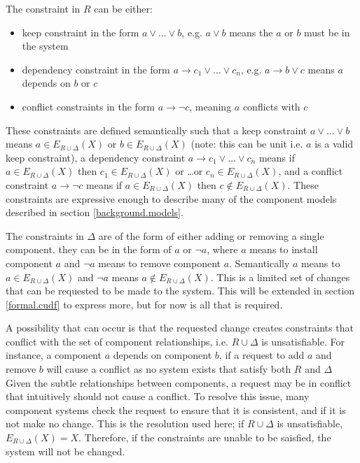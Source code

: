 The constraint in $R$ can be either: 
\begin{itemize}
  \item keep constraint in the form $a \vee \ldots \vee b$, e.g. $a \vee b$ means the $a$ or $b$ must be in the system
  \item dependency constraint in the form $a \rightarrow c_1 \vee \ldots \vee c_n$, e.g. $a \rightarrow b \vee c$ means $a$ depends on $b$ or $c$
  \item conflict constraints in the form $a \rightarrow \neg c$, meaning $a$ conflicts with $c$
\end{itemize}
These constraints are defined semantically such that
a keep constraint  $a \vee \ldots \vee b$ means $a \in E_{R \cup \Delta}(X)$ or $b \in E_{R \cup \Delta}(X)$ (note: this can be unit i.e. $a$ is a valid keep constraint),
a dependency constraint $a \rightarrow c_1 \vee \ldots \vee c_n$ means if $a \in E_{R \cup \Delta}(X)$ then $c_1 \in E_{R \cup \Delta}(X)$ or \ldots or $c_n \in E_{R \cup \Delta}(X)$,
and a conflict constraint $a \rightarrow \neg c$ means if $a \in E_{R \cup \Delta}(X)$ then $c \not \in E_{R \cup \Delta}(X)$.
These constraints are expressive enough to describe many of the component models described in section \ref{background.models}.

The constraints in $\Delta$ are of the form of either adding or removing a single component.
they can be in the form of $a$ or $\neg a$, where $a$ means to install component $a$ and $\neg a$ means to remove component $a$.
Semantically $a$ means to $a \in E_{R \cup \Delta}(X)$ and $\neg a$ means $a \not \in E_{R \cup \Delta}(X)$. 
This is a limited set of changes that can be requested to be made to the system.
This will be extended in section \ref{formal.cudf} to express more, but for now is all that is required.

A possibility that can occur is that the requested change creates constraints that conflict with the set of component relationships,
i.e. $R \cup \Delta$ is unsatisfiable.
For instance, a component $a$ depends on component $b$, 
if a request to add $a$ and remove $b$ will cause a conflict as no system exists that satisfy both $R$ and $\Delta$  
Given the subtle relationships between components, a request may be in conflict that intuitively should not cause a conflict.
To resolve this issue, many component systems check the request to ensure that it is consistent, and if it is not make no change.
This is the resolution used here;
if $R \cup \Delta$ is unsatisfiable, $E_{R \cup \Delta}(X) = X$.
Therefore, if the constraints are unable to be saisfied, the system will not be changed.

